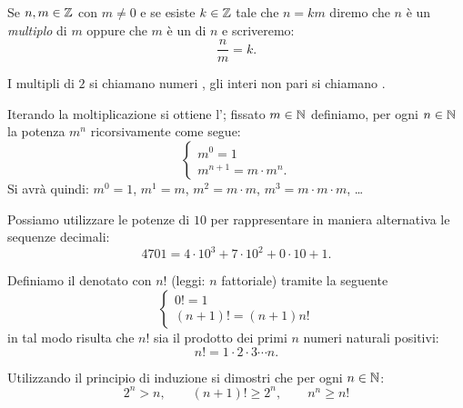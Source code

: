 Se $n,m\in\mathbb Z$ con $m\neq 0$ e 
%
se esiste $k\in\mathbb Z$ tale 
che $n=km$ diremo che $n$ è un \emph{multiplo}
di $m$ oppure che $m$ è un  di $n$
e scriveremo:
\[
  \frac{n}{m} = k.  
\]

I multipli di $2$ si chiamano numeri ,
gli interi non pari si chiamano . 

Iterando la moltiplicazione si ottiene 
l';
fissato $m\in \mathbb N$ definiamo, per ogni $n\in \mathbb N$ la potenza $m^n$ 
ricorsivamente come segue:
\[
  \begin{cases}
    m^0 = 1 \\
    m^{n+1} = m \cdot m^n.
  \end{cases}
\]
Si avrà quindi: $m^0=1$, $m^1=m$, $m^2=m\cdot m$, $m^3=m\cdot m\cdot m$, \dots

Possiamo utilizzare le potenze di $10$ per rappresentare in maniera alternativa 
le sequenze decimali:
\[
  4701 = 4\cdot 10^3 + 7\cdot 10^2+0\cdot 10 + 1.
\]

Definiamo il 
%
%
denotato con $n!$ (leggi: $n$ fattoriale) 
tramite la seguente 
\[
  \begin{cases}
    0! = 1 \\
    (n+1)! = (n+1) n!
  \end{cases}
\]
in tal modo risulta che $n!$ sia il prodotto dei primi $n$ numeri naturali positivi:
\[
  n! = 1 \cdot 2 \cdot 3 \cdots n.  
\]

\begin{exercise}
  \label{ex:6734098}%
  Utilizzando il principio di induzione
  si dimostri che per ogni $n\in \mathbb N$:
  \[
    2^n > n, \qquad 
    (n+1)! \ge 2^n, \qquad
    n^n \ge n!
  \]
\end{exercise}

